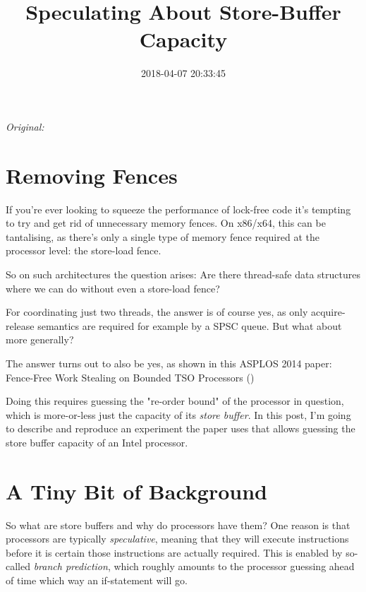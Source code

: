 \documentclass[11pt]{article}
\begin{document}
\title{Speculating About Store-Buffer Capacity}
\date{2018-04-07 20:33:45}
\maketitle

\noindent\textit{Original: }\texttt{}\par
\medskip
\section{Removing Fences}

If you're ever looking to squeeze the performance of lock-free code it's tempting to try and get rid of unnecessary memory fences. On x86/x64, this can be tantalising, as there's only a single type of memory fence required at the processor level: the store-load fence.

So on such architectures the question arises: Are there thread-safe data structures where we can do without even a store-load fence?

For coordinating just two threads, the answer is of course yes, as only acquire-release semantics are required for example by a SPSC queue. But what about more generally?

The answer turns out to also be yes, as shown in this ASPLOS 2014 paper: 
Fence-Free Work Stealing on Bounded TSO Processors (\texttt{})

Doing this requires guessing the "re-order bound" of the processor in question, which is more-or-less just the capacity of its \emph{store buffer}. In this post, I'm going to describe and reproduce an experiment the paper uses that allows guessing the store buffer capacity of an Intel processor. 

\section{A Tiny Bit of Background}

So what are store buffers and why do processors have them? One reason is that processors are typically \emph{speculative}, meaning that they will execute instructions before it is certain those instructions are actually required. This is enabled by so-called \emph{branch prediction}, which roughly amounts to the processor guessing ahead of time which way an if-statement will go.
\end{document}
